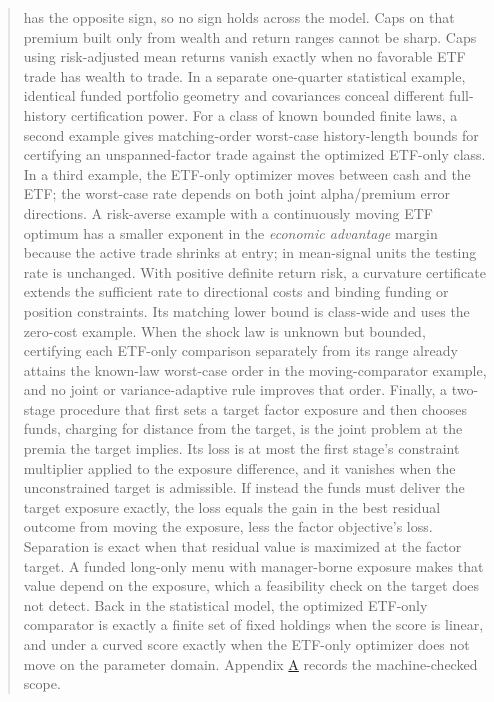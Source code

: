\documentclass[11pt]{article}
\begin{document}
\begin{abstract}
has the opposite sign, so no sign holds across the model.
Caps on that premium built only from wealth and return ranges
cannot be sharp. Caps using risk-adjusted mean returns vanish
exactly when no favorable ETF trade has wealth to trade. In a
separate one-quarter statistical example, identical funded
portfolio geometry and covariances conceal different
full-history certification power. For a class of known bounded
finite laws, a second example gives matching-order worst-case history-length
bounds for certifying an unspanned-factor trade against the
optimized ETF-only class. In a third example, the ETF-only
optimizer moves between cash and the ETF; the worst-case rate
depends on both joint alpha/premium error directions. A risk-averse
example with a continuously moving ETF optimum has a smaller
exponent in the \emph{economic advantage} margin because the active
trade shrinks at entry; in mean-signal units the testing rate is
unchanged. With positive definite return risk, a curvature
certificate extends the sufficient rate to directional costs
and binding funding or position constraints. Its matching
lower bound is class-wide and uses the zero-cost example.
When the shock law is unknown but bounded, certifying each
ETF-only comparison separately from its range already attains
the known-law worst-case order in the moving-comparator example,
and no joint or variance-adaptive rule improves that order.
Finally, a two-stage procedure that first sets a target factor
exposure and then chooses funds, charging for distance from the
target, is the joint problem at the premia the target implies. Its
loss is at most the first stage's constraint multiplier applied to
the exposure difference, and it vanishes when the unconstrained
target is admissible. If instead the funds must deliver the target
exposure exactly, the loss equals the gain in the best residual
outcome from moving the exposure, less the factor objective's loss.
Separation is exact when that residual value is maximized at the
factor target. A funded long-only menu with manager-borne exposure
makes that value depend on the exposure, which a feasibility check
on the target does not detect. Back in the statistical model, the
optimized ETF-only comparator is exactly a finite set of fixed
holdings when the score is linear, and under a curved score exactly
when the ETF-only optimizer does not move on the parameter domain.
Appendix \hyperref[sec:A]{A} records the machine-checked scope.
\end{abstract}
\vspace{0.6em}
\end{document}
